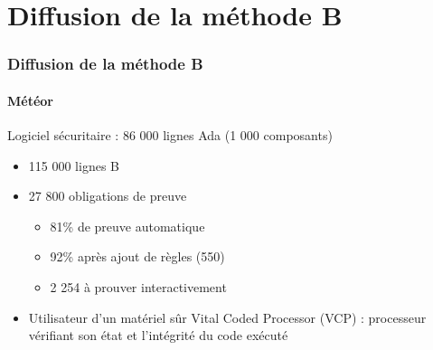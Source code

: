 \documentclass[11pt,a4paper,xcolor=table]{beamer} %
\begin{document}
\section{Diffusion de la méthode B}
\begin{frame}
\frametitle{Diffusion de la méthode B}
\framesubtitle{Météor}
Logiciel sécuritaire : 86 000 lignes Ada (1 000
composants)
\begin{itemize}
\item 115 000 lignes B
\item 27 800 obligations de preuve
\begin{itemize}
\item 81\% de preuve automatique
\item 92\% après ajout de règles (550)
\item 2 254 à prouver interactivement
\end{itemize}
\item Utilisateur d'un matériel sûr Vital Coded Processor (VCP) : processeur vérifiant son état et l'intégrité du code exécuté
\end{itemize}
\end{frame}

\end{document}

